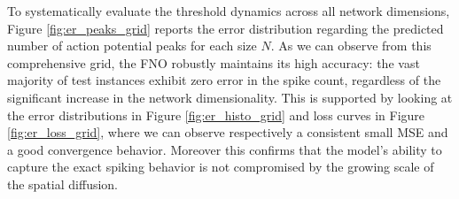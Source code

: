 To systematically evaluate the threshold dynamics across all network dimensions, Figure \ref{fig:er_peaks_grid} reports the error distribution regarding the predicted number of action potential peaks for each size $N$. As we can observe from this comprehensive grid, the FNO robustly maintains its high accuracy: the vast majority of test instances exhibit zero error in the spike count, regardless of the significant increase in the network dimensionality. This is supported by looking at the error distributions in Figure \ref{fig:er_histo_grid} and loss curves in Figure \ref{fig:er_loss_grid}, where we can observe respectively a consistent small MSE and a good convergence behavior. Moreover this confirms that the model's ability to capture the exact spiking behavior is not compromised by the growing scale of the spatial diffusion.


